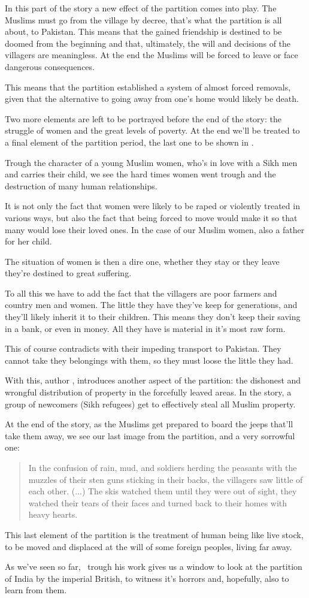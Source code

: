 \documentclass{scrartcl}
\begin{document}
In this part of the story a new effect of the
partition comes into play.
The Muslims must go from the village by decree,
that's what the partition is all about,
to Pakistan.
This means that the gained friendship is destined
to be doomed from the beginning
and that, ultimately,
the will and decisions of the villagers are meaningless.
At the end the Muslims will be forced to leave or
face dangerous consequences.

This means that the partition established a system
of almost forced removals, given that the alternative
to going away from one's home would likely be death.

Two more elements are left to be portrayed
before the end of the story:
the struggle of women and the great levels of poverty.
At the end we'll be treated to a final element of the partition
period, the last one to be shown in \tpak.

Trough the character of a young Muslim women,
who's in love with a Sikh men and carries their child,
we see the hard times women went trough and
the destruction of many human relationships.

It is not only the fact that women were
likely to be raped or violently treated in various ways,
but also the fact that being forced to move would
make it so that many would lose their loved ones.
In the case of our Muslim women, also a father for her child.

The situation of women is then a dire one,
whether they stay or they leave they're destined
to great suffering.

To all this we have to add the fact that the villagers
are poor farmers and country men and women.
The little they have they've keep for generations,
and they'll likely inherit it to their children.
This means they don't keep their saving in a bank,
or even in money.
All they have is material in it's most raw form.

This of course contradicts with their impeding
transport to Pakistan.
They cannot take they belongings with them,
so they must loose the little they had.

With this, author \ks, introduces another aspect of
the partition: the dishonest and wrongful distribution
of property in the forcefully leaved areas.
In the story, a group of newcomers (Sikh refugees)
get to effectively steal all Muslim property.

At the end of the story, as the Muslims get prepared
to board the jeeps that'll take them away,
we see our last image from the partition, and
a very sorrowful one:
\begin{quote}
  In the confusion of rain, mud, and soldiers
  herding the peasants with the muzzles of their sten guns
  sticking in their backs, the villagers saw little of each other.
  (...)
  The skis watched them until they were out of sight,
  they watched their tears of their faces and turned back to
  their homes with heavy hearts.
  \cite[p. 185, para. 1]{khushwant_singh_train_1990}
\end{quote}
This last element of the partition is the treatment
of human being like live stock, to be moved and displaced
at the will of some foreign peoples,
living far away.

As we've seen so far,
\ks\ trough his work gives us a window
to look at the partition of India
by the imperial British,
to witness it's horrors and,
hopefully,
also to learn from them.
%
%
\end{document}

